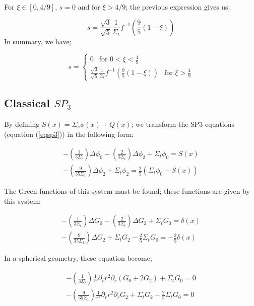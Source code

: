 \documentclass[a4paper, 12pt]{report}
\begin{document}
For $\xi \in [0,4/9]$, $s= 0$ and for $\xi > 4/9$; the previous expression gives us:

\begin{equation}
s = \frac{\sqrt{3}}{\sqrt{5}}\frac{1}{\Sigma_t}f^{-1}\left(\frac{9}{5}(1-\xi)\right)
\end{equation}
In summary, we have;
\begin{center}
\begin{equation}
s = \begin{cases}
 0  \ \ \text{ for } 0 < \xi < \frac{4}{9} \\ 
 \frac{\sqrt{3}}{\sqrt{5}}\frac{1}{\Sigma_t}f^{-1}\left(\frac{9}{5}(1-\xi)\right) \ \ \text{ for }  \xi > \frac{4}{9} 
\end{cases}
\end{equation}
\end{center}
\subsection{Classical $SP_3$}
By defining $S(x) = \Sigma_s \phi(x) + Q(x)$; we transform the SP3 equations (equation (\ref{eqsp3})) in the following form;

\begin{align}
-\left(\frac{1}{3\Sigma_t}\right)\Delta\phi_0 -  \left(\frac{2}{3\Sigma_t}\right)\Delta\phi_2 + \Sigma_t \phi_0 = S(x)\\
-\left(\frac{9}{35\Sigma_1}\right)\Delta\phi_2  + \Sigma_t \phi_2 = \frac{2}{5}(\Sigma_t \phi_0 - S(x))
\end{align}

The Green functions of this system must be found; these functions are given by this system;

\begin{align}
-\left(\frac{1}{3\Sigma_t}\right)\Delta G_0 -  \left(\frac{2}{3\Sigma_t}\right)\Delta G_2 + \Sigma_t G_0 = \delta(x)\\
-\left(\frac{9}{35\Sigma_1}\right)\Delta G_2  + \Sigma_t G_2 - \frac{2}{5}\Sigma_t G_0 = -\frac{2}{5} \delta(x)
\end{align}

In a spherical geometry, these equation become;

\begin{align}
-\left(\frac{1}{3\Sigma_t}\right)\frac{1}{r^2} \partial_r r^2 \partial_r (G_0+2G_2) + \Sigma_t G_0 = 0\\
-\left(\frac{9}{35\Sigma_1}\right)\frac{1}{r^2} \partial_r r^2 \partial_r  G_2  + \Sigma_t G_2 - \frac{2}{5}\Sigma_t G_0 =0
\end{align}
\end{document}
